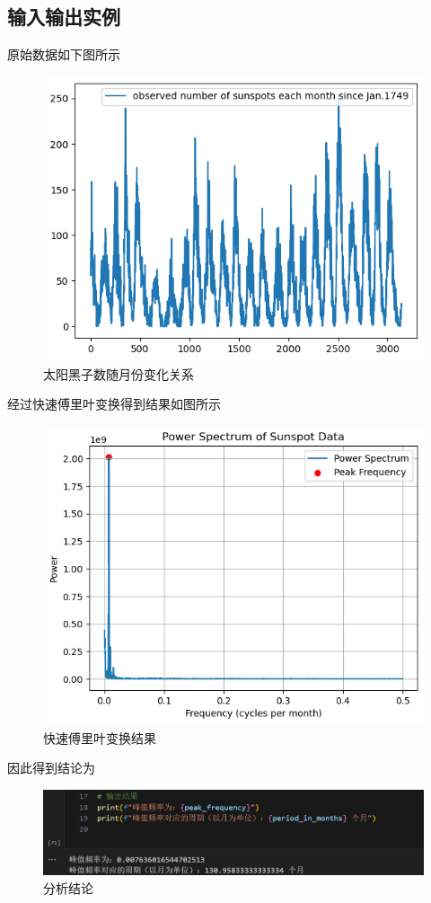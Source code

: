 \documentclass[11pt]{article}
\begin{document}
\subsection{输入输出实例}
原始数据如下图所示
\begin{figure}[H]
    \centering
    \includegraphics[width=0.5\linewidth]{data.png}
    \caption{太阳黑子数随月份变化关系}
    \label{fig:太阳黑子数随月份变化关系}
\end{figure}

经过快速傅里叶变换得到结果如图所示
\begin{figure}[H]
    \centering
    \includegraphics[width=0.5\linewidth]{output.png}
    \caption{快速傅里叶变换结果}
    \label{fig:快速傅里叶变换结果}
\end{figure}

因此得到结论为
\begin{figure}[H]
    \centering
    \includegraphics[width=0.5\linewidth]{conclusion.png}
    \caption{分析结论}
    \label{fig:分析结论}
\end{figure}

\end{document}
